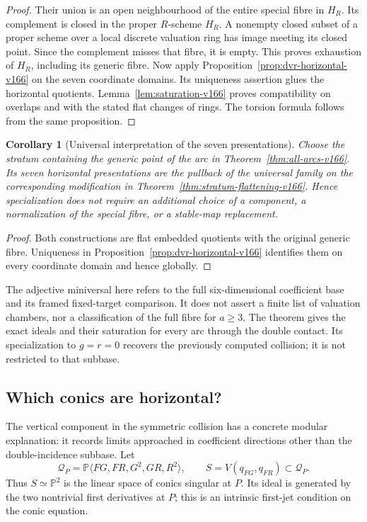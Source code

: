 \documentclass[11pt,reqno]{amsart}
\numberwithin{equation}{section}
\newtheorem{corollary}[theorem]{Corollary}
\theoremstyle{definition}\newtheorem{definition}[theorem]{Definition}
\theoremstyle{remark}\newtheorem{remark}[theorem]{Remark}
\newcommand{\Pj}{\mathbb P}\newcommand{\A}{\mathbb A}
\begin{document}
\begin{proof}
Their union is an open neighbourhood of the entire special fibre
in $H_R$. Its complement is closed in the proper $R$-scheme $H_R$.
A nonempty closed subset of a proper scheme over a local discrete
valuation ring has image meeting its closed point. Since the
complement misses that fibre, it is empty. This proves exhaustion
of $H_R$, including its generic fibre. Now apply
Proposition~\ref{prop:dvr-horizontal-v166} on the seven coordinate
domains. Its uniqueness assertion glues the horizontal quotients.
Lemma~\ref{lem:saturation-v166} proves compatibility on overlaps
and with the stated flat changes of rings. The torsion formula
follows from the same proposition.
\end{proof}

\begin{corollary}[Universal interpretation of the seven presentations]
\label{cor:all-arcs-universal-v166}
Choose the stratum containing the generic point of the arc in
Theorem~\ref{thm:all-arcs-v166}. Its seven horizontal presentations
are the pullback of the universal family on the corresponding
modification in Theorem~\ref{thm:stratum-flattening-v166}. Hence
specialization does not require an additional choice of a component,
a normalization of the special fibre, or a stable-map replacement.
\end{corollary}
\begin{proof}
Both constructions are flat embedded quotients with the original
generic fibre. Uniqueness in
Proposition~\ref{prop:dvr-horizontal-v166} identifies them on every
coordinate domain and hence globally.
\end{proof}

The adjective miniversal here refers to the full six-dimensional
coefficient base and its framed fixed-target comparison. It does
not assert a finite list of valuation chambers, nor a classification
of the full fibre for $a\geq3$. The theorem gives the exact ideals
and their saturation for every arc through the double contact. Its
specialization to $g=r=0$ recovers the previously computed collision;
it is not restricted to that subbase.

\subsection{Which conics are horizontal?}
The vertical component in the symmetric collision has a concrete
modular explanation: it records limits approached in coefficient
directions other than the double-incidence subbase. Let
\[
 \mathcal Q_P=\Pj\langle FG,FR,G^2,GR,R^2\rangle,\qquad
 S=V(q_{FG},q_{FR})\subset\mathcal Q_P.
\]
Thus $S\simeq\Pj^2$ is the linear space of conics singular at $P$.
Its ideal is generated by the two nontrivial first derivatives at
$P$; this is an intrinsic first-jet condition on the conic equation.
\end{document}

